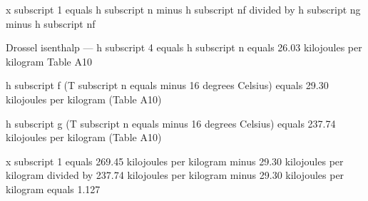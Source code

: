 x subscript 1 equals h subscript n minus h subscript nf divided by h subscript ng minus h subscript nf  

Drossel isenthalp — h subscript 4 equals h subscript n equals 26.03 kilojoules per kilogram  
Table A10  

h subscript f (T subscript n equals minus 16 degrees Celsius) equals 29.30 kilojoules per kilogram  
(Table A10)  

h subscript g (T subscript n equals minus 16 degrees Celsius) equals 237.74 kilojoules per kilogram  
(Table A10)  

x subscript 1 equals 269.45 kilojoules per kilogram minus 29.30 kilojoules per kilogram divided by 237.74 kilojoules per kilogram minus 29.30 kilojoules per kilogram equals 1.127